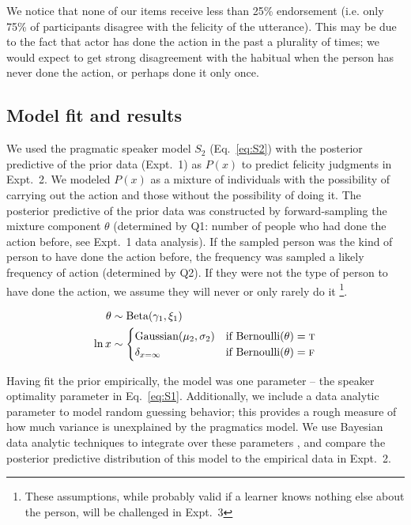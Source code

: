 \documentclass[10pt,letterpaper]{article}
\begin{document}
We notice that none of our items receive less than 25\% endorsement (i.e. only 75\% of participants disagree with the felicity of the utterance).
This may be due to the fact that actor has done the action in the past a plurality of times; we would expect to get strong disagreement with the habitual when the person has never done the action, or perhaps done it only once.

\subsection{Model fit and results}

We used the pragmatic speaker model $S_2$ (Eq.~\ref{eq:S2}) with the posterior predictive of the prior data (Expt.~1) as $P(x)$  to predict felicity judgments in Expt.~2.
We modeled $P(x)$ as a mixture of individuals with the possibility of carrying out the action and those without the possibility of doing it. 
The posterior predictive of the prior data was constructed by forward-sampling the mixture component $\theta$ (determined by Q1: number of people who had done the action before, see Expt.~1 data analysis).
If the sampled person was the kind of person to have done the action before, the frequency was sampled a likely frequency of action (determined by Q2). 
If they were not the type of person to have done the action, we assume they will never or only rarely do it
\footnote{These assumptions, while probably valid if a learner knows nothing else about the person, will be challenged in Expt.~3}.

\begin{minipage}{0.5 \textwidth} \small
\begin{align*}
\theta & \sim \text{Beta}(\gamma_{1}, \xi_{1}) \\ 
\ln x & \sim \begin{cases} 
		\text{Gaussian}(\mu_{2}, \sigma_{2}) &\mbox{if } \text{Bernoulli}(\theta) = \textsc{t} \\
				\delta_{x=\infty} &\mbox{if } \text{Bernoulli}(\theta) = \textsc{f} \\
		\end{cases} \\
\end{align*}
\end{minipage}

Having fit the prior empirically, the model was one parameter -- the speaker optimality parameter in Eq.~\ref{eq:S1}. 
Additionally, we include a data analytic parameter to model random guessing behavior; this provides a rough measure of how much variance is unexplained by the pragmatics model. 
We use Bayesian data analytic techniques to integrate over these parameters \cite{LW2014}, and compare the posterior predictive distribution of this model to the empirical data in Expt.~2.
\end{document}
